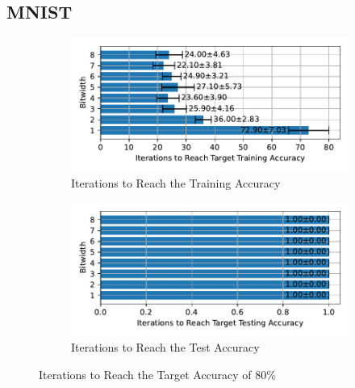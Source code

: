     \subsection{MNIST}
    \label{appendix:iterations_mnist}
        \begin{figure}[H]
            \centering
            \begin{subfigure}[H]{0.6\textwidth}
                \centering
                \includegraphics[width=\textwidth]{../standard/MNIST/plots/mnist_train_iters_horizontal.pdf}
                \caption{Iterations to Reach the Training Accuracy}
            \end{subfigure}
            \hfill
            \begin{subfigure}[H]{0.6\textwidth}
                \centering
                \includegraphics[width=\textwidth]{../standard/MNIST/plots/mnist_test_iters_horizontal.pdf}
                \caption{Iterations to Reach the Test Accuracy}
            \end{subfigure}
            \caption{Iterations to Reach the Target Accuracy of 80\%}
        \end{figure}

